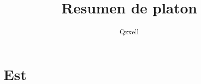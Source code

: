 \documentclass{book}
\author{Qzxell}
\title{Resumen de platon}
\begin{document}
\section{Est}
\end{document}
